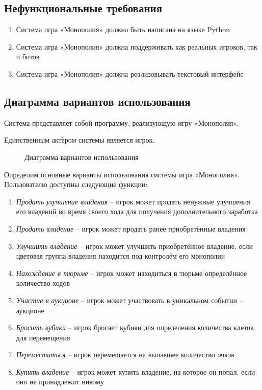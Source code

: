 \subsection{Нефункциональные требования}
\begin{spacing}{0.9}
\begin{enumerate}
    \item Система игра «Монополия» должна быть написана на языке Python 
    \item Система игра «Монополия» должна поддерживать как реальных игроков, так и ботов
    \item Система игра «Монополия» должна реализовывать текстовый интерфейс
\end{enumerate}
\end{spacing}
\subsection{Диаграмма вариантов использования}
Система представляет собой программу, реализующую игру «Монополия».

Единственным актёром системы является игрок.
\begin{figure}[h!]
    \caption{Диаграмма вариантов использования}
\end{figure}

Определим основные варианты использования системы игра «Монополия». Пользователю доступны следующие функции:
\begin{enumerate}
    \item \textit{Продать улучшение владения} – игрок может продать ненужные улучшения его владений во время своего хода для получения дополнительного заработка
    \item \textit{Продать владение} – игрок может продать ранее приобретённые владения
    \item \textit{Улучшить владение} – игрок может улучшить приобретённое владение, если цветовая группа владения находится под контролём его монополии
    \item \textit{Нахождение в тюрьме} – игрок может находиться в тюрьме определённое количество ходов
    \item \textit{Участие в аукционе} – игрок может участвовать в уникальном событии – аукционе
    \item \textit{Бросить кубики} – игрок бросает кубики для определения количества клеток для перемещения
    \item \textit{Переместиться} – игрок перемещается на выпавшее количество очков
    \item \textit{Купить владение} – игрок может купить владение, на которое он попал, если оно не принадлежит никому
\end{enumerate}
